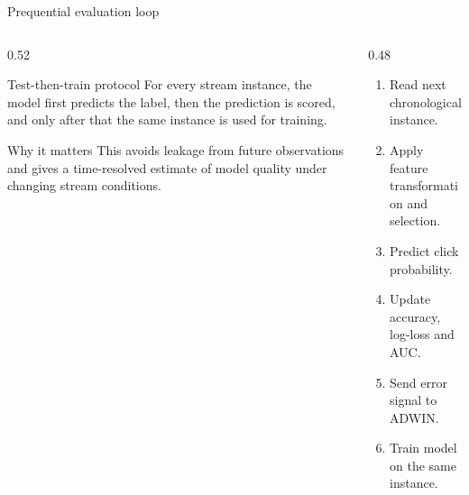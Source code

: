 \documentclass[aspectratio=169,xcolor=dvipsnames]{beamer}
\begin{document}
\begin{frame}{Prequential evaluation loop}
\begin{columns}[T]
    \begin{column}{0.52\textwidth}
        \begin{block}{Test-then-train protocol}
        \small
        For every stream instance, the model first predicts the label, then the prediction is scored, and only after that the same instance is used for training.
        \end{block}

        \vspace{0.15cm}
        \begin{block}{Why it matters}
        \small
        This avoids leakage from future observations and gives a time-resolved estimate of model quality under changing stream conditions.
        \end{block}
    \end{column}

    \begin{column}{0.48\textwidth}
        \small
        \begin{enumerate}
            \item Read next chronological instance.
            \item Apply feature transformation and selection.
            \item Predict click probability.
            \item Update accuracy, log-loss and AUC.
            \item Send error signal to ADWIN.
            \item Train model on the same instance.
        \end{enumerate}
    \end{column}
\end{columns}
\end{frame}
\end{document}
